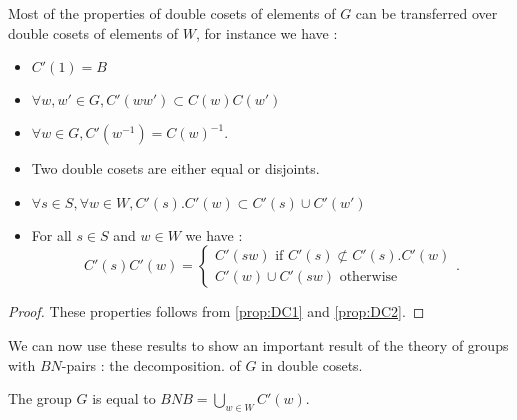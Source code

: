 Most of the properties of double cosets of elements of $G$ can be transferred over double cosets of elements of $W$, for instance we have : 

\begin{proprietes} \label{prop:DC3}
    \begin{itemize}
        \item  $C'\left( 1 \right) = B$
        \item $\forall w,w'\in G, C'\left( w w' \right) \subset C(w) C(w')$
        \item $\forall w \in G, C'\left( w^{-1} \right) = C\left( w \right)^{-1}$.
        \item Two double cosets are either equal or disjoints.
\item $\forall s \in S, \forall w \in W, C'(s). C'(w) \subset C'(s) \cup  C'(w')$
\item For all $s \in S$ and $w \in W$ we have :
     \[
     C'(s) C'(w) = \begin{cases}
         C'(sw) \text{ if } C'(s) \not \subset C'(s).C'(w)\\
         C'(w) \cup C'(sw) \text{ otherwise}
     \end{cases}
     .\] 
    \end{itemize}
\end{proprietes}  

\begin{proof}
    These properties follows from \ref{prop:DC1} and \ref{prop:DC2}.
\end{proof}

We can now use these results to show an important result of the theory of groups with $BN$-pairs : the decomposition. of $G$ in double cosets.

\begin{theoreme} \label{thm:DCD}
    The group $G$ is equal to $B N B = \bigcup_{w \in W} C'\left( w \right)$.
\end{theoreme}


